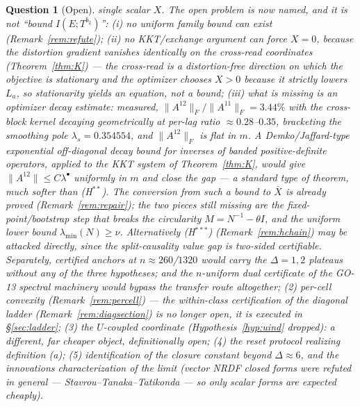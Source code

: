 \documentclass[11pt]{article}
\newtheorem{question}{Question}
\theoremstyle{definition}
\theoremstyle{remark}
\begin{document}
\begin{question}[Open]
single scalar $X$. The open problem is now \emph{named}, and it is not
``bound $I(E;T^{b_2})$'': (i) no \emph{uniform family} bound can exist
(Remark~\ref{rem:refute}); (ii) no KKT/exchange argument can force
$X=0$, because the distortion gradient vanishes identically on the
cross-read coordinates (Theorem~\ref{thm:K}) --- the cross-read is a
distortion-\emph{free} direction on which the objective is stationary
and the optimizer chooses $X>0$ because it strictly lowers $L_a$, so
stationarity yields an equation, not a bound; (iii) what is missing is
an \emph{optimizer decay estimate}: measured,
$\|A^{12}\|_F/\|A^{11}\|_F=3.44\%$ with the cross-block kernel decaying
geometrically at per-lag ratio $\approx0.28$--$0.35$, bracketing the
smoothing pole $\lambda_s=0.354554$, and $\|A^{12}\|_F$ is
\emph{flat in $m$}. A Demko/Jaffard-type
\cite{bib:dms84,bib:jaffard90} exponential off-diagonal decay
bound for inverses of banded positive-definite operators, applied to
the KKT system of Theorem~\ref{thm:K}, would give
$\|A^{12}\|\le C\lambda^{\bullet}$ uniformly in $m$ and close the gap
--- a standard \emph{type} of theorem, much softer than
(H$^{\ast\ast}$). The conversion from such a bound to $\bar X$ is
already proved (Remark~\ref{rem:repair}); the two pieces still missing
are the fixed-point/bootstrap step that breaks the circularity
$M=N^{-1}-\theta I$, and the uniform lower bound
$\lambda_{\min}(N)\ge\nu$. Alternatively (H$^{\ast\ast\ast}$)
(Remark~\ref{rem:hchain}) may be attacked directly, since the
split-causality value gap is two-sided certifiable. Separately,
certified anchors at $n\approx260$/$1320$ would carry the
$\Delta=1,2$ plateaus without any of the three hypotheses; and the
$n$-uniform dual certificate of the GO-13 spectral machinery would
bypass the transfer route altogether;
(2) per-cell convexity (Remark~\ref{rem:percell}) --- the
within-class certification of the diagonal ladder
(Remark~\ref{rem:diagsection}) is no longer open, it is executed in
\S\ref{sec:ladder};
(3) the $U$-coupled coordinate (Hypothesis~\ref{hyp:uind} dropped):
a different, far cheaper object, definitionally open; (4) the reset
protocol realizing definition (a); (5) identification of the
closure constant beyond $\Delta\approx6$, and the innovations
characterization of the limit (vector NRDF closed forms were
refuted in general --- Stavrou--Tanaka--Tatikonda \cite{bib:stt17} ---
so only
scalar forms are expected cheaply).
\end{question}
\end{document}
